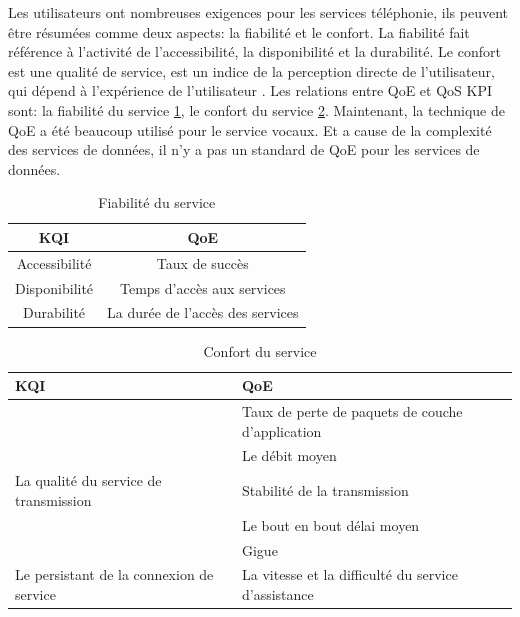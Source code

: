 Les utilisateurs ont nombreuses exigences pour les services téléphonie, ils peuvent être résumées comme deux aspects: la fiabilité et le confort. La fiabilité fait référence à l'activité de l'accessibilité, la disponibilité et la durabilité. Le confort est une qualité de service, est un indice de la perception directe de l'utilisateur, qui dépend à l'expérience de l'utilisateur \cite{QoE}. Les relations entre QoE et QoS KPI sont: la fiabilité du service \ref{table.fiabilité}, le confort du service \ref{table.confort}. Maintenant, la technique de QoE a été beaucoup utilisé pour le service vocaux. Et a cause de la complexité des services de données, il n'y a pas un standard de QoE pour les services de données. 

\begin{table}[H]
	\centering
	\caption{Fiabilité du service }
	\label{table.fiabilité}
\begin{tabular}{|c|c|}
\hline \rule[-2ex]{0pt}{5.5ex} KQI & QoE \\ 
\hline \rule[-2ex]{0pt}{5.5ex} Accessibilité & Taux de succès  \\ 
\hline \rule[-2ex]{0pt}{5.5ex} Disponibilité  & Temps d'accès aux services \\ 
\hline \rule[-2ex]{0pt}{5.5ex} Durabilité & La durée de l'accès des services \\ 
\hline 
\end{tabular} 
\end{table}

\begin{table}[H]
	\centering
	\caption{Confort du service}
	\label{table.confort}
\begin{tabular}{|>{\centering\arraybackslash}p{5 cm}|>{\centering\arraybackslash}p{6 cm}|}
\hline KQI & QoE \\ 
\hline  & Taux de perte de paquets de couche d'application \\ 
\hline  & Le débit moyen  \newline \\ 
\hline La qualité du service de transmission & Stabilité de la transmission \\ 
\hline & Le bout en bout délai moyen \newline  \\ 
\hline & Gigue \newline  \\ 
\hline Le persistant de la connexion de service & La vitesse et la difficulté du service d'assistance\\ 
\hline 
\end{tabular} 
\end{table}


